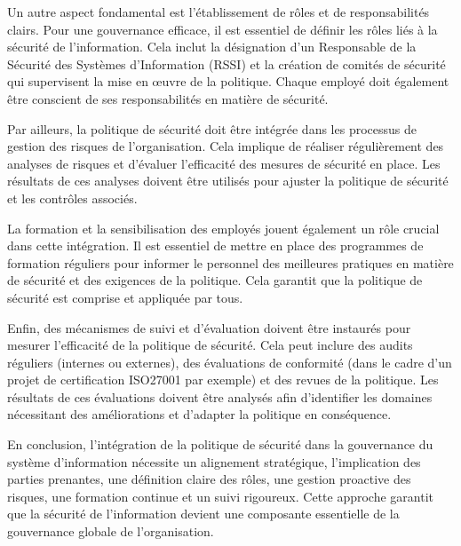 Un autre aspect fondamental est l'établissement de rôles et de responsabilités clairs. Pour une gouvernance efficace, il est essentiel de définir les rôles liés à la sécurité de l'information. Cela inclut la désignation d'un Responsable de la Sécurité des Systèmes d'Information (RSSI) et la création de comités de sécurité qui supervisent la mise en œuvre de la politique. Chaque employé doit également être conscient de ses responsabilités en matière de sécurité.

Par ailleurs, la politique de sécurité doit être intégrée dans les processus de gestion des risques de l'organisation. Cela implique de réaliser régulièrement des analyses de risques et d'évaluer l'efficacité des mesures de sécurité en place. Les résultats de ces analyses doivent être utilisés pour ajuster la politique de sécurité et les contrôles associés.

La formation et la sensibilisation des employés jouent également un rôle crucial dans cette intégration. Il est essentiel de mettre en place des programmes de formation réguliers pour informer le personnel des meilleures pratiques en matière de sécurité et des exigences de la politique. Cela garantit que la politique de sécurité est comprise et appliquée par tous.

Enfin, des mécanismes de suivi et d'évaluation doivent être instaurés pour mesurer l'efficacité de la politique de sécurité. Cela peut inclure des audits réguliers (internes ou externes), des évaluations de conformité (dans le cadre d'un projet de certification ISO27001 par exemple) et des revues de la politique. Les résultats de ces évaluations doivent être analysés afin d'identifier les domaines nécessitant des améliorations et d'adapter la politique en conséquence.

En conclusion, l'intégration de la politique de sécurité dans la gouvernance du système d'information nécessite un alignement stratégique, l'implication des parties prenantes, une définition claire des rôles, une gestion proactive des risques, une formation continue et un suivi rigoureux. Cette approche garantit que la sécurité de l'information devient une composante essentielle de la gouvernance globale de l'organisation.

